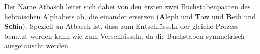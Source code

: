 \begin{table}[h!]
\centering
\caption{Tabula Recta der Atbasch-Verschlüsselung}
\label{tab:tabula-recta-atbasch}
\end{table}

Der Name Atbasch leitet sich dabei von den ersten zwei Buchstabenpaaren des hebräischen Alphabets ab, die einander ersetzen (\textbf{A}leph und \textbf{T}aw und \textbf{B}eth und \textbf{Sch}in). Speziell an Atbasch ist, dass zum Entschlüsseln der gleiche Prozess benutzt werden kann wie zum Verschlüsseln, da die Buchstaben symmetrisch ausgetauscht werden.


